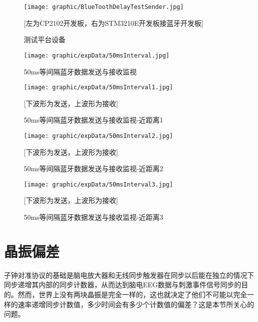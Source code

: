 \begin{figure}[!hbp]
\begin{center}
\texttt{[image: graphic/BlueToothDelayTestSender.jpg]}
\caption{测试平台设备 \label{TestPlatForm}}
[左为CP2102开发板，右为STM3210E开发板接蓝牙开发板]
\end{center}
\end{figure}
\begin{figure}[!hbp]
\begin{center}
\texttt{[image: graphic/expData/50msInterval.jpg]}
\caption{50ms等间隔蓝牙数据发送与接收监视 \label{BlueToothSpy50ms}}
\end{center}
\end{figure}

\begin{figure}[!hbp]
\begin{center}
\texttt{[image: graphic/expData/50msInterval1.jpg]}
\caption{50ms等间隔蓝牙数据发送与接收监视-近距离1 \label{BlueToothSpy50ms1}}
[下波形为发送，上波形为接收]
\end{center}
\end{figure}

\begin{figure}[!hbp]
\begin{center}
\texttt{[image: graphic/expData/50msInterval2.jpg]}
\caption{50ms等间隔蓝牙数据发送与接收监视-近距离2 \label{BlueToothSpy50ms2}}
[下波形为发送，上波形为接收]
\end{center}
\end{figure}

\begin{figure}[!hbp]
\begin{center}
\texttt{[image: graphic/expData/50msInterval3.jpg]}
\caption{50ms等间隔蓝牙数据发送与接收监视-近距离3 \label{BlueToothSpy50ms3}}
[下波形为发送，上波形为接收]
\end{center}
\end{figure}

\section{晶振偏差\label{sec:SourceOscillator}}
	子钟对准协议的基础是脑电放大器和无线同步触发器在同步以后能在独立的情况下同步递增其内部的同步计数器，从而达到脑电EEG数据与刺激事件信号同步的目的。然而，世界上没有两块晶振是完全一样的，这也就决定了他们不可能以完全一样的速率递增同步计数值，多少时间会有多少个计数值的偏差？这是本节所关心的问题。

